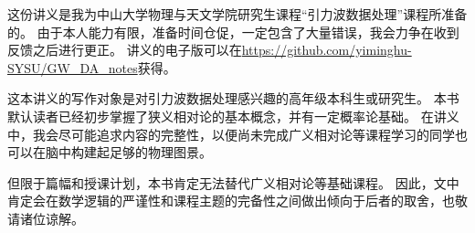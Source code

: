 \begin{overview}
\thispagestyle{empty}

这份讲义是我为中山大学物理与天文学院研究生课程“引力波数据处理”课程所准备的。
由于本人能力有限，准备时间仓促，一定包含了大量错误，我会力争在收到反馈之后进行更正。
讲义的电子版可以在\url{https://github.com/yiminghu-SYSU/GW_DA_notes}获得。

这本讲义的写作对象是对引力波数据处理感兴趣的高年级本科生或研究生。
本书默认读者已经初步掌握了狭义相对论的基本概念，并有一定概率论基础。
在讲义中，我会尽可能追求内容的完整性，以便尚未完成广义相对论等课程学习的同学也可以在脑中构建起足够的物理图景。

但限于篇幅和授课计划，本书肯定无法替代广义相对论等基础课程。
因此，文中肯定会在数学逻辑的严谨性和课程主题的完备性之间做出倾向于后者的取舍，也敬请诸位谅解。

\end{overview}
